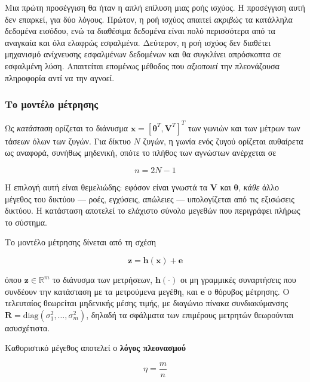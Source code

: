 Μια πρώτη προσέγγιση θα ήταν η απλή επίλυση μιας ροής ισχύος. Η προσέγγιση αυτή δεν
επαρκεί, για δύο λόγους. Πρώτον, η ροή ισχύος απαιτεί \emph{ακριβώς} τα κατάλληλα δεδομένα
εισόδου, ενώ τα διαθέσιμα δεδομένα είναι πολύ περισσότερα από τα αναγκαία και όλα ελαφρώς
εσφαλμένα. Δεύτερον, η ροή ισχύος δεν διαθέτει μηχανισμό ανίχνευσης εσφαλμένων δεδομένων
και θα συγκλίνει απρόσκοπτα σε εσφαλμένη λύση. Απαιτείται επομένως μέθοδος που
\emph{αξιοποιεί} την πλεονάζουσα πληροφορία αντί να την αγνοεί.

\subsubsection*{Το μοντέλο μέτρησης}

Ως \emph{κατάσταση} ορίζεται το διάνυσμα
$\mathbf{x} = [\boldsymbol{\theta}^{T}, \mathbf{V}^{T}]^{T}$ των γωνιών και των μέτρων των
τάσεων όλων των ζυγών. Για δίκτυο $N$ ζυγών, η γωνία ενός ζυγού ορίζεται αυθαίρετα ως
αναφορά, συνήθως μηδενική, οπότε το πλήθος των αγνώστων ανέρχεται σε

\begin{equation}
n = 2N - 1
\label{eq:nstates}
\end{equation}

Η επιλογή αυτή είναι θεμελιώδης: εφόσον είναι γνωστά τα $\mathbf{V}$ και
$\boldsymbol{\theta}$, \emph{κάθε} άλλο μέγεθος του δικτύου — ροές, εγχύσεις, απώλειες —
υπολογίζεται από τις εξισώσεις δικτύου. Η κατάσταση αποτελεί το ελάχιστο σύνολο μεγεθών που
περιγράφει πλήρως το σύστημα.

Το μοντέλο μέτρησης δίνεται από τη σχέση

\begin{equation}
\mathbf{z} = \mathbf{h}(\mathbf{x}) + \mathbf{e}
\label{eq:measmodel}
\end{equation}

όπου $\mathbf{z} \in \mathbb{R}^{m}$ το διάνυσμα των μετρήσεων, $\mathbf{h}(\cdot)$ οι μη
γραμμικές συναρτήσεις που συνδέουν την κατάσταση με τα μετρούμενα μεγέθη, και $\mathbf{e}$
ο θόρυβος μέτρησης. Ο τελευταίος θεωρείται μηδενικής μέσης τιμής, με διαγώνιο πίνακα
συνδιακύμανσης $\mathbf{R} = \mathrm{diag}(\sigma_1^2, \ldots, \sigma_m^2)$, δηλαδή τα
σφάλματα των επιμέρους μετρητών θεωρούνται ασυσχέτιστα.

Καθοριστικό μέγεθος αποτελεί ο \textbf{λόγος πλεονασμού}

\begin{equation}
\eta = \frac{m}{n}
\label{eq:redundancy}
\end{equation}

